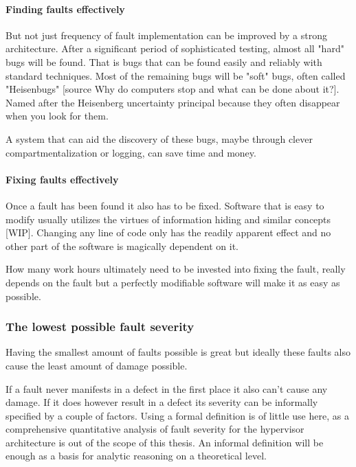 \paragraph{Finding faults effectively}
But not just frequency of fault implementation can be improved by a strong architecture. After a significant period of sophisticated testing, almost all "hard" bugs will be found. That is bugs that can be found easily and reliably
with standard techniques. Most of the remaining bugs will be "soft" bugs, often called "Heisenbugs" [source Why do computers stop and what can be done about it?]. Named after the Heisenberg uncertainty principal because they often disappear when you look for them. 

A system that can aid the discovery of these bugs, maybe through clever compartmentalization or logging, can save time and money.
\paragraph{Fixing faults effectively}
Once a fault has been found it also has to be fixed. Software that is easy to modify usually utilizes the virtues of information hiding and similar  concepts [WIP]. Changing any line of code only has the readily apparent effect and no other part of the software is magically dependent on it.

How many work hours ultimately need to be invested into fixing the fault, really depends on the fault but a perfectly modifiable software will make it as easy as possible.
\subsubsection{The lowest possible fault severity}
Having the smallest amount of faults possible is great but ideally these faults also cause the least amount of damage possible. 

If a fault never manifests in a defect in the first place it also can't cause any damage. If it does however result in a defect its severity can be informally specified by a couple of factors. Using a formal definition is of little use here, as a comprehensive quantitative analysis of fault severity for the hypervisor architecture is out of the scope of this thesis. An informal definition will be enough as a basis for analytic reasoning on a theoretical level.
